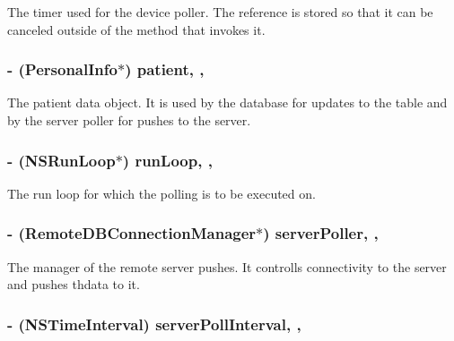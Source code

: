 The timer used for the device poller. The reference is stored so that it can be canceled outside of the method that invokes it. \hypertarget{interface_background_scheduler_a3f2d5c8d892ff5c8155305ae6bc2da1a}{
\subsubsection[{patient}]{\setlength{\rightskip}{0pt plus 5cm}-\/ ({\bf Personal\-Info}$\ast$) patient\hspace{0.3cm}{\ttfamily [read]}, {\ttfamily [write]}, {\ttfamily [atomic]}}}\label{interface_background_scheduler_a3f2d5c8d892ff5c8155305ae6bc2da1a}
The patient data object. It is used by the database for updates to the table and by the server poller for pushes to the server. \hypertarget{interface_background_scheduler_a73f120ac0977837ac4a4095ad96d01ec}{
\subsubsection[{run\-Loop}]{\setlength{\rightskip}{0pt plus 5cm}-\/ (N\-S\-Run\-Loop$\ast$) run\-Loop\hspace{0.3cm}{\ttfamily [read]}, {\ttfamily [write]}, {\ttfamily [atomic]}}}\label{interface_background_scheduler_a73f120ac0977837ac4a4095ad96d01ec}
The run loop for which the polling is to be executed on. \hypertarget{interface_background_scheduler_a6dd785826954ce8d6adc2ad76284c458}{
\subsubsection[{server\-Poller}]{\setlength{\rightskip}{0pt plus 5cm}-\/ ({\bf Remote\-D\-B\-Connection\-Manager}$\ast$) server\-Poller\hspace{0.3cm}{\ttfamily [read]}, {\ttfamily [write]}, {\ttfamily [atomic]}}}\label{interface_background_scheduler_a6dd785826954ce8d6adc2ad76284c458}
The manager of the remote server pushes. It controlls connectivity to the server and pushes thdata to it. \hypertarget{interface_background_scheduler_a6a4ebd391d86c9779122136b6c4dfc1c}{
\subsubsection[{server\-Poll\-Interval}]{\setlength{\rightskip}{0pt plus 5cm}-\/ (N\-S\-Time\-Interval) server\-Poll\-Interval\hspace{0.3cm}{\ttfamily [read]}, {\ttfamily [write]}, {\ttfamily [atomic]}}}\label{interface_background_scheduler_a6a4ebd391d86c9779122136b6c4dfc1c}
